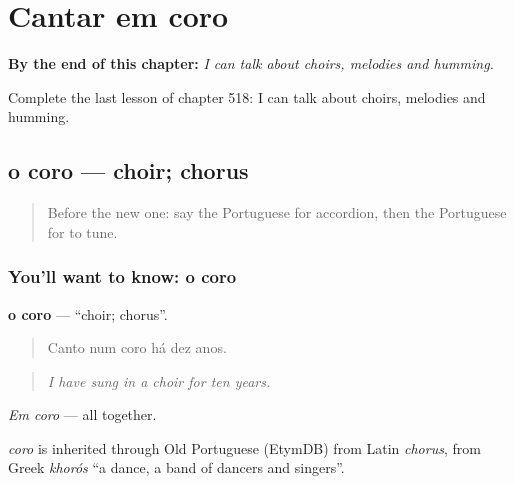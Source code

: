 
\chapter{Cantar em coro}
\label{ch:pt-cantar-em-coro}

\begin{chapteropening}
\textbf{By the end of this chapter:} \emph{I can talk about choirs, melodies and humming.}

Complete the last lesson of chapter 518: I can talk about choirs, melodies and humming.
\end{chapteropening}

\section[o coro]{o coro — choir; chorus}

\label{lesson:PT-C518-coro}



\begin{quote}
Before the new one: say the Portuguese for accordion, then the Portuguese for to tune.
\end{quote}

\subsection*{You'll want to know: o coro}
\textbf{o coro} — \textquotedblleft{}choir; chorus\textquotedblright{}.

\begin{quote}
Canto num coro há dez anos.
\end{quote}

\begin{quote}
\emph{I have sung in a choir for ten years.}
\end{quote}

\emph{Em coro} — all together.

\begin{cousinweb}
\emph{coro} is inherited through Old Portuguese (EtymDB) from Latin \emph{chorus}, from Greek \emph{khorós} \textquotedblleft{}a dance, a band of dancers and singers\textquotedblright{}.
\end{cousinweb}

